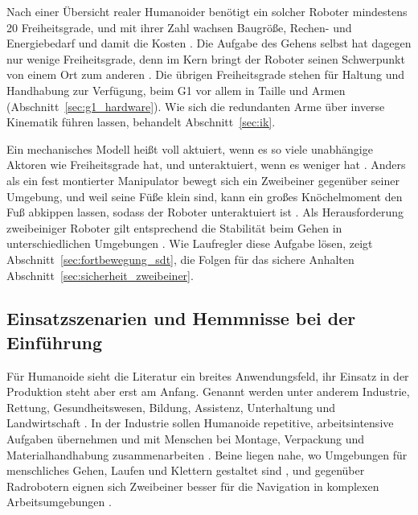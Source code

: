 Nach einer Übersicht realer Humanoider benötigt ein solcher Roboter mindestens 20 Freiheitsgrade, und mit ihrer Zahl wachsen Baugröße, Rechen- und Energiebedarf und damit die Kosten \cite{Saeedvand2019}.
Die Aufgabe des Gehens selbst hat dagegen nur wenige Freiheitsgrade, denn im Kern bringt der Roboter seinen Schwerpunkt von einem Ort zum anderen \cite{Westervelt2018}.
Die übrigen Freiheitsgrade stehen für Haltung und Handhabung zur Verfügung, beim G1 vor allem in Taille und Armen (Abschnitt~\ref{sec:g1_hardware}).
Wie sich die redundanten Arme über inverse Kinematik führen lassen, behandelt Abschnitt~\ref{sec:ik}.

Ein mechanisches Modell heißt voll aktuiert, wenn es so viele unabhängige Aktoren wie Freiheitsgrade hat, und unteraktuiert, wenn es weniger hat \cite{Westervelt2018}.
Anders als ein fest montierter Manipulator bewegt sich ein Zweibeiner gegenüber seiner Umgebung, und weil seine Füße klein sind, kann ein großes Knöchelmoment den Fuß abkippen lassen, sodass der Roboter unteraktuiert ist \cite{Westervelt2018}.
Als Herausforderung zweibeiniger Roboter gilt entsprechend die Stabilität beim Gehen in unterschiedlichen Umgebungen \cite{Saeedvand2019}.
Wie Laufregler diese Aufgabe lösen, zeigt Abschnitt~\ref{sec:fortbewegung_sdt}, die Folgen für das sichere Anhalten Abschnitt~\ref{sec:sicherheit_zweibeiner}.

\subsection{Einsatzszenarien und Hemmnisse bei der Einführung}
\label{sec:humanoide_einsatz}
Für Humanoide sieht die Literatur ein breites Anwendungsfeld, ihr Einsatz in der Produktion steht aber erst am Anfang.
Genannt werden unter anderem Industrie, Rettung, Gesundheitswesen, Bildung, Assistenz, Unterhaltung und Landwirtschaft \cite{Tong2024}.
In der Industrie sollen Humanoide repetitive, arbeitsintensive Aufgaben übernehmen und mit Menschen bei Montage, Verpackung und Materialhandhabung zusammenarbeiten \cite{Tong2024}.
Beine liegen nahe, wo Umgebungen für menschliches Gehen, Laufen und Klettern gestaltet sind \cite{Westervelt2018}, und gegenüber Radrobotern eignen sich Zweibeiner besser für die Navigation in komplexen Arbeitsumgebungen \cite{Saeedvand2019}.

